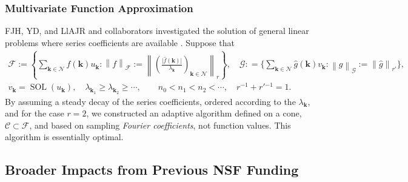 \documentclass[11pt]{NSFamsart}
\newcommand{\hf}{\widehat{f}}
\newcommand{\hg}{\widehat{g}}
\DeclareMathOperator{\SOL}{SOL}
\newcommand{\bk}{{\boldsymbol{k}}}
\newcommand{\cc}{\mathcal{C}}
\newcommand{\calf}{{\mathcal{F}}}
\newcommand{\calg}{{\mathcal{G}}}
\newcommand{\caln}{{\mathcal{N}}}
\newcommand{\bigabs}[1]{\ensuremath{\bigl \lvert #1 \bigr \rvert}}
\newcommand{\norm}[2][{}]{\ensuremath{\left \lVert #2 \right \rVert}_{#1}}
\newcommand{\bignorm}[2][{}]{\ensuremath{\bigl \lVert #2 \bigr \rVert}_{#1}}
\begin{document}
\subsubsection{Multivariate Function Approximation} \label{sec:PrevFunAppx}

FJH, YD, and LlAJR and collaborators investigated the solution of general linear problems where series coefficients are available \cite{DinHic20a}.  Suppose that 
\begin{subequations} \label{serForm}
\begin{gather}
    \calf := \left \{ \sum_{\bk \in \caln} \hf(\bk) u_{\bk} : \norm[\calf]{f} := \norm[r]{\left(\frac{\bigabs{\hf(\bk)}}{\lambda_{\bk}} \right)_{\bk \in \caln}} \right \},  \quad
    \calg : = \biggl \{ \sum_{\bk \in \caln} \hg(\bk) v_{\bk} : \norm[\calg]{g} := \bignorm[r']{\hg}\biggr \}, \\ 
    v_{\bk} = \SOL(u_{\bk}), \quad
     \lambda_{\bk_1} \ge \lambda_{\bk_2} \ge \cdots, \qquad
      n_0 < n_1 < n_2 < \cdots, \quad r^{-1} + r'{}^{-1} = 1.
\end{gather}

\end{subequations}
By assuming a steady decay of the series coefficients, ordered according to the $\lambda_{\bk}$, and for the case $r=2$, we constructed an adaptive algorithm defined on a cone, $\cc \subset \calf$, and based on sampling \emph{Fourier coefficients}, not function values.  This algorithm is essentially optimal.


\subsection{Broader Impacts from Previous NSF Funding} \label{prevBIsect}
\end{document}
